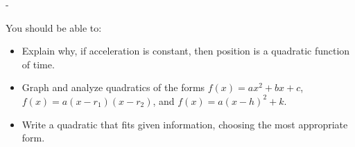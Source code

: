 \documentclass{article}
\makeatletter
\newlength{\tipmargin}
\renewenvironment{framed}{
  \setlength{\tipmargin}{\textwidth-\linewidth}
  \advance\@totalleftmargin-\tipmargin
  \def\FrameCommand{\hspace{\tipmargin}\fbox}%
  \advance\linewidth\tipmargin
  \MakeFramed {\advance\hsize-\width \FrameRestore}%
}
{\endMakeFramed}
\makeatother
\begin{document}

\begin{problemonly}
  \begin{framed}

You should be able to:
    \begin{itemize}[topsep=0pt,partopsep=0pt,parsep=8pt,itemsep=0pt]
    \item Explain why, if acceleration is constant, then position is a quadratic function of time.

    \item Graph and analyze quadratics of the forms $f(x) = ax^2 + bx + c$, $f(x) = a (x - r_1)(x - r_2)$, and $f(x) = a (x - h)^2 + k$.

    \item Write a quadratic that fits given information, choosing the most appropriate form.

    \end{itemize}
  \end{framed}
\end{problemonly}
\end{document}
